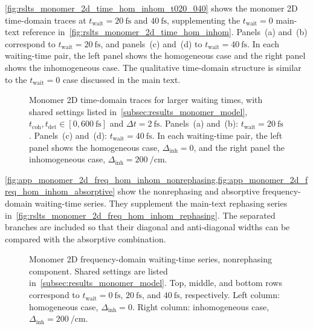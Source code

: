 \autoref{fig:rslts_monomer_2d_time_hom_inhom_t020_040} shows the monomer 2D
time-domain traces at
\(t_{\mathrm{wait}}=\SI{20}{\femto\second}\) and
\(\SI{40}{\femto\second}\), supplementing the \(t_{\mathrm{wait}}=0\) main-text
reference in~\autoref{fig:rslts_monomer_2d_time_hom_inhom}. Panels~(a) and~(b)
correspond to \(t_{\mathrm{wait}}=\SI{20}{\femto\second}\), and panels~(c)
and~(d) to \(t_{\mathrm{wait}}=\SI{40}{\femto\second}\). In each waiting-time
pair, the left panel shows the homogeneous case and the right panel shows the
inhomogeneous case. The qualitative time-domain structure is similar to the
\(t_{\mathrm{wait}}=0\) case discussed in the main text.

\begin{figure}[htbp]
    \centering
    \caption{Monomer 2D time-domain traces for larger waiting times, with
    shared settings listed in~\autoref{subsec:results_monomer_model},
    \(t_{\mathrm{coh}},t_{\mathrm{det}}\in[0,\SI{600}{\femto\second}]\) and
    \(\Delta t=\SI{2}{\femto\second}\). Panels~(a) and~(b):
    \(t_{\mathrm{wait}}=\SI{20}{\femto\second}\). Panels~(c) and~(d):
    \(t_{\mathrm{wait}}=\SI{40}{\femto\second}\). In each waiting-time pair,
    the left panel shows the homogeneous case, \(\Delta_{\mathrm{inh}}=0\), and
    the right panel the inhomogeneous case,
    \(\Delta_{\mathrm{inh}}=\SI{200}{\per\centi\metre}\).}
    \label{fig:rslts_monomer_2d_time_hom_inhom_t020_040}
\end{figure}

\cref{fig:app_monomer_2d_freq_hom_inhom_nonrephasing,fig:app_monomer_2d_freq_hom_inhom_absorptive}
show the nonrephasing and absorptive frequency-domain waiting-time series. They
supplement the main-text rephasing series
in~\autoref{fig:rslts_monomer_2d_freq_hom_inhom_rephasing}. The separated
branches are included so that their diagonal and anti-diagonal widths can be
compared with the absorptive combination.

\begin{figure}[htbp]
    \centering
    \caption{Monomer 2D frequency-domain waiting-time series, nonrephasing
    component. Shared settings are listed
    in~\autoref{subsec:results_monomer_model}. Top, middle, and bottom rows correspond to
    \(t_{\mathrm{wait}}=\SI{0}{\femto\second}\),
    \(\SI{20}{\femto\second}\), and \(\SI{40}{\femto\second}\),
    respectively. Left column: homogeneous case,
    \(\Delta_{\mathrm{inh}}=0\). Right column: inhomogeneous case,
    \(\Delta_{\mathrm{inh}}=\SI{200}{\per\centi\metre}\).}
    \label{fig:app_monomer_2d_freq_hom_inhom_nonrephasing}
\end{figure}

